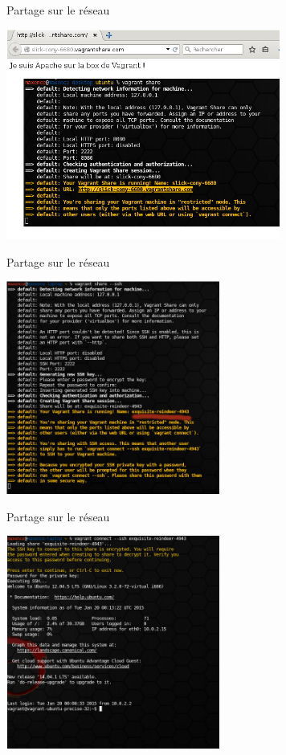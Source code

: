\documentclass{beamer}
\begin{document}
    \begin{frame}{Partage sur le réseau}
        \begin{center}
            \includegraphics[width=9cm]{images_rapport/sharehttp.jpg}
        \end{center}
    \end{frame}

    \begin{frame}{Partage sur le réseau}
        \begin{center}
            \includegraphics[width=7cm]{images_rapport/vagrantshare.jpg}
        \end{center}
    \end{frame}

    \begin{frame}{Partage sur le réseau}
        \begin{center}
            \includegraphics[width=7cm]{images_rapport/vagrantconnect.jpg}
        \end{center}
    \end{frame}
\end{document}
